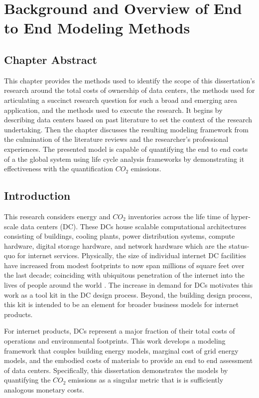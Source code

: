 \chapter{Background and Overview of End to End Modeling Methods}

\section{Chapter Abstract}

This chapter provides the methods used to identify the scope of this dissertation's research around the total costs of ownership of data centers, the methods used for articulating a succinct research question for such a broad and emerging area application, and the methods used to execute the research. It begins by describing data centers based on past literature to set the context of the research undertaking. Then the chapter discusses the resulting modeling framework from the culmination of the literature reviews and the researcher's professional experiences. The presented model is capable of quantifying the end to end costs of a the global system using life cycle analysis frameworks by demonstrating it effectiveness with the quantification $CO_2$ emissions. 

\section{Introduction}

    This research considers energy and $CO_2$ inventories across the life time of hyper-scale data centers (DC). These DCs house scalable computational architectures consisting of buildings, cooling plants, power distribution systems, compute hardware, digital storage hardware, and network hardware which are the status-quo for internet services. Physically, the size of individual internet DC facilities have increased from modest footprints to now span millions of square feet over the last decade; coinciding with ubiquitous penetration of the internet into the lives of people around the world . The increase in demand for DCs motivates this work as a tool kit in the DC design process. Beyond, the building design process, this kit is intended to be an element for broader business models for internet products.
    
    For internet products, DCs represent a major fraction of their total costs of operations and environmental footprints.  This work develops a modeling framework that couples building energy models, marginal cost of grid energy models, and the embodied costs of materials to provide an end to end assessment of data centers. Specifically, this dissertation demonstrates the models by quantifying the $CO_2$ emissions as a singular metric that is is sufficiently analogous monetary costs.
    
